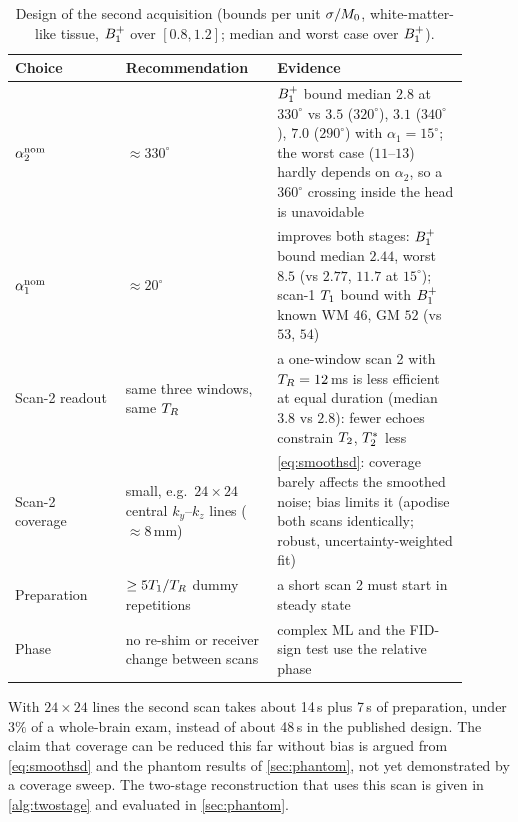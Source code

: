 \begin{table}[!htbp]
\centering
\caption{Design of the second acquisition (bounds per unit $\sigma/M_0$, white-matter-like tissue,
$B_1^{+}$ over $[0.8,1.2]$; median and worst case over $B_1^{+}$).}
\label{tab:design}
\small
\begin{tabular}{p{0.22\linewidth}p{0.30\linewidth}p{0.38\linewidth}}
\toprule
Choice & Recommendation & Evidence\\
\midrule
$\alpha_2^{\rm nom}$ & $\approx330^\circ$ & $B_1^{+}$ bound median $2.8$ at $330^\circ$ vs $3.5$ ($320^\circ$), $3.1$ ($340^\circ$), $7.0$ ($290^\circ$) with $\alpha_1=15^\circ$; the worst case ($11$--$13$) hardly depends on $\alpha_2$, so a $360^\circ$ crossing inside the head is unavoidable\\
$\alpha_1^{\rm nom}$ & $\approx20^\circ$ & improves both stages: $B_1^{+}$ bound median $2.44$, worst $8.5$ (vs $2.77$, $11.7$ at $15^\circ$); scan-1 $T_1$ bound with $B_1^{+}$ known WM $46$, GM $52$ (vs $53$, $54$)\\
Scan-2 readout & same three windows, same $T_R$ & a one-window scan 2 with $T_R=12$\,ms is less efficient at equal duration (median $3.8$ vs $2.8$): fewer echoes constrain $T_2$, $T_2^{*}$ less\\
Scan-2 coverage & small, e.g.\ $24\times24$ central $k_y$--$k_z$ lines ($\approx8$\,mm) & \eqref{eq:smoothsd}: coverage barely affects the smoothed noise; bias limits it (apodise both scans identically; robust, uncertainty-weighted fit)\\
Preparation & $\ge5T_1/T_R$ dummy repetitions & a short scan 2 must start in steady state\\
Phase & no re-shim or receiver change between scans & complex ML and the FID-sign test use the relative phase\\
\bottomrule
\end{tabular}
\end{table}

With $24\times24$ lines the second scan takes about 14\,s plus 7\,s of preparation, under $3\%$ of a
whole-brain exam, instead of about 48\,s in the published design. The claim that coverage can be
reduced this far without bias is argued from \eqref{eq:smoothsd} and the phantom results of
\cref{sec:phantom}, not yet demonstrated by a coverage sweep. The two-stage reconstruction
that uses this scan is given in \cref{alg:twostage} and evaluated in \cref{sec:phantom}.
